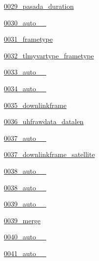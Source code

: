 \begin{DoxyCompactItemize}
 \hyperlink{namespace_ground_segment_1_1migrations_1_10029__pasada__duration}{0029\+\_\+pasada\+\_\+duration}
\item 
 \hyperlink{namespace_ground_segment_1_1migrations_1_10030__auto__20170125__1955}{0030\+\_\+auto\+\_\+\_}
\item 
 \hyperlink{namespace_ground_segment_1_1migrations_1_10031__frametype}{0031\+\_\+frametype}
\item 
 \hyperlink{namespace_ground_segment_1_1migrations_1_10032__tlmyvartype__frametype}{0032\+\_\+tlmyvartype\+\_\+frametype}
\item 
 \hyperlink{namespace_ground_segment_1_1migrations_1_10033__auto__20170130__1316}{0033\+\_\+auto\+\_\+\_}
\item 
 \hyperlink{namespace_ground_segment_1_1migrations_1_10034__auto__20170130__1320}{0034\+\_\+auto\+\_\+\_}
\item 
 \hyperlink{namespace_ground_segment_1_1migrations_1_10035__downlinkframe}{0035\+\_\+downlinkframe}
\item 
 \hyperlink{namespace_ground_segment_1_1migrations_1_10036__uhfrawdata__datalen}{0036\+\_\+uhfrawdata\+\_\+datalen}
\item 
 \hyperlink{namespace_ground_segment_1_1migrations_1_10037__auto__20170131__1727}{0037\+\_\+auto\+\_\+\_}
\item 
 \hyperlink{namespace_ground_segment_1_1migrations_1_10037__downlinkframe__satellite}{0037\+\_\+downlinkframe\+\_\+satellite}
\item 
 \hyperlink{namespace_ground_segment_1_1migrations_1_10038__auto__20170131__1731}{0038\+\_\+auto\+\_\+\_}
\item 
 \hyperlink{namespace_ground_segment_1_1migrations_1_10038__auto__20170131__1736}{0038\+\_\+auto\+\_\+\_}
\item 
 \hyperlink{namespace_ground_segment_1_1migrations_1_10039__auto__20170131__2008}{0039\+\_\+auto\+\_\+\_}
\item 
 \hyperlink{namespace_ground_segment_1_1migrations_1_10039__merge}{0039\+\_\+merge}
\item 
 \hyperlink{namespace_ground_segment_1_1migrations_1_10040__auto__20170131__2025}{0040\+\_\+auto\+\_\+\_}
\item 
 \hyperlink{namespace_ground_segment_1_1migrations_1_10041__auto__20170131__2030}{0041\+\_\+auto\+\_\+\_}
\item 

\end{DoxyCompactItemize}
